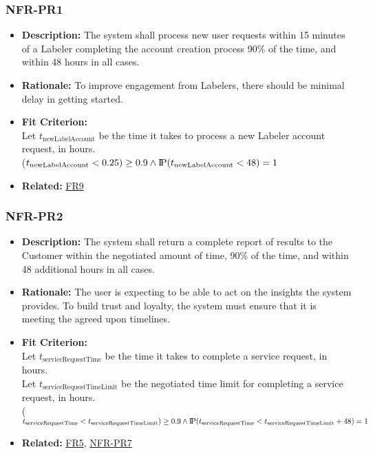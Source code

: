 \documentclass[12pt]{article}
\newcommand{\probP}{\text{I\kern-0.15em P}}
\begin{document}
\subsubsection*{NFR-PR1}
\label{sec:PR1}
\begin{itemize}
  \item \textbf{Description:} The system shall process new user requests within 15 minutes of a Labeler  completing the account creation process 90\% of the time, and within 48 hours in all cases. 
  \item \textbf{Rationale:} To improve engagement from Labelers, there should be minimal delay in getting started.
  \item \textbf{Fit Criterion:}\\ Let $t_{\text{newLabelAccount}}$ be the time it takes to process a new Labeler account request, in hours.\\ \probP($t_{\text{newLabelAccount}} < 0.25) \geq 0.9 \wedge \probP(t_{\text{newLabelAccount}} < 48) = 1 $
  \item \textbf{Related:} \hyperref[sec:FR9]{FR9}
\end{itemize}

\subsubsection*{NFR-PR2}
\label{sec:PR2}
\begin{itemize}
  \item \textbf{Description:} The system shall return a complete report of results to the Customer within the negotiated amount of time, 90\% of the time, and within 48 additional hours in all cases.
  \item \textbf{Rationale:} The user is expecting to be able to act on the insights the system provides. To build trust and loyalty, the system must ensure that it is meeting the agreed upon timelines.
  \item \textbf{Fit Criterion:}\\ Let $t_{\text{serviceRequestTime}}$ be the time it takes to complete a service request, in hours.\\
  Let $t_{\text{serviceRequestTimeLimit}}$ be the negotiated time limit for completing a service request, in hours.\\ \probP($t_{\text{serviceRequestTime}} < t_{\text{serviceRequestTimeLimit}}) \geq 0.9\\ \wedge \probP(t_{\text{serviceRequestTime}} < t_{\text{serviceRequestTimeLimit}}+48) = 1 $
  \item \textbf{Related:} \hyperref[sec:FR5]{FR5},  \hyperref[sec:PR7]{NFR-PR7}
\end{itemize}
\end{document}

